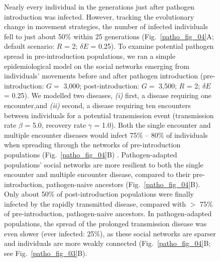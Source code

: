 \begin{figure}[!h]
Nearly every individual in the generations just after pathogen introduction was infected.
However, tracking the evolutionary change in movement strategies, the number of infected individuals fell to just about 50\% within 25 generations (Fig.~\ref{patho_fig_04}A; default scenario: $R$ = 2; $\delta E$ = 0.25).
To examine potential pathogen spread in pre-introduction populations, we ran a simple epidemiological model on the social networks emerging from individuals' movements before and after pathogen introduction (pre-introduction: $G =$ 3,000; post-introduction: $G =$ 3,500; $R$ = 2; $\delta E$ = 0.25).
We modelled two diseases, \textit{(i)} first, a disease requiring one encounter,and \textit{(ii)} second, a disease requiring ten encounters between individuals for a potential transmission event (transmission rate $\beta$ = 5.0, recovery rate $\gamma$ = 1.0).
Both the single encounter and multiple encounter diseases would infect 75\% -- 80\% of individuals when spreading through the networks of pre-introduction populations (Fig.~\ref{patho_fig_04}B)
.
Pathogen-adapted populations' social networks are more resilient to both the single encounter and multiple encounter disease, compared to their pre-introduction, pathogen-naive ancestors (Fig.~\ref{patho_fig_04}B).
Only about 50\% of post-introduction populations were finally infected by the rapidly transmitted disease, compared with $>$ 75\% of pre-introduction, pathogen-naive ancestors.
In pathogen-adapted populations, the spread of the prolonged transmission disease was even slower (ever infected: 25\%), as these social networks are sparser and individuals are more weakly connected (Fig.~\ref{patho_fig_04}B; see Fig.~\ref{patho_fig_03}B).


\end{figure}
